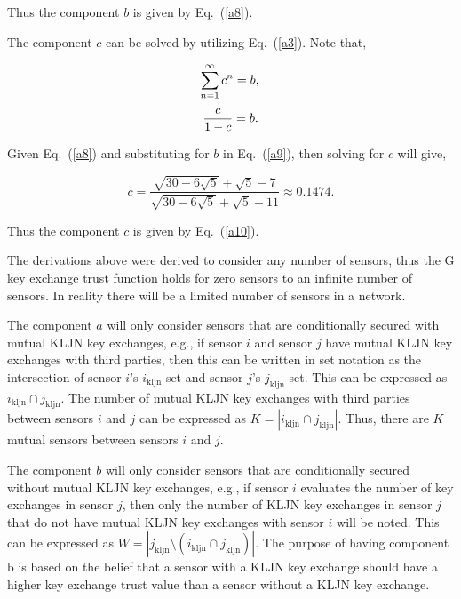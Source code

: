 \documentclass{ws-fnl2}
\begin{document}
\noindent
Thus the component $b$ is given by Eq.~(\ref{a8}).


The component $c$ can be solved by utilizing Eq.~(\ref{a3}). Note that,

\begin{equation*}
\sum^\infty_{n=1}c^n = b,\\ 
\end{equation*}
\begin{equation}
 \frac{c}{1-c}=b. \\
 \label{a9}
\end{equation}


\noindent
Given Eq.~(\ref{a8}) and substituting for $b$ in Eq.~(\ref{a9}), then solving for $c$ will give,

\begin{equation}
 c=\frac{\sqrt{30-6\sqrt{5}}+\sqrt{5}-7}{\sqrt{30-6\sqrt{5}}+\sqrt{5}-11} \approx 0.1474.
 \label{a10}
\end{equation}

\noindent
Thus the component $c$ is given by Eq.~(\ref{a10}).

The derivations above were derived to consider any number of sensors, thus the G key exchange trust function holds for zero sensors to an infinite number of sensors. In reality there will be a limited number of sensors in a network. 

The component $a$ will only consider sensors that are conditionally secured with mutual KLJN key exchanges, e.g., if sensor $i$ and sensor $j$ have mutual KLJN key exchanges with third parties, then this can be written in set notation as the intersection of sensor $i$'s $i_{\mathrm{kljn}}$ set and sensor $j$'s $j_{\mathrm{kljn}}$ set. This can be expressed as $i_{\mathrm{kljn}} \cap j_{\mathrm{kljn}}$. The number of mutual KLJN key exchanges with third parties between sensors $i$ and $j$ can be expressed as $K=|i_{\mathrm{kljn}} \cap j_{\mathrm{kljn}}|$. Thus, there are $K$ mutual sensors between sensors $i$ and $j$. 

The component $b$ will only consider sensors that are conditionally secured without mutual KLJN key exchanges, e.g., if sensor $i$ evaluates the number of key exchanges in sensor $j$, then only the number of KLJN key exchanges in sensor $j$ that do not have mutual KLJN key exchanges with sensor $i$ will be noted. This can be expressed as $W=|j_{\mathrm{kljn}} \setminus (i_{\mathrm{kljn}} \cap j_{\mathrm{kljn}})|$. The purpose of having component b is based on the belief that a sensor with a KLJN key exchange should have a higher key exchange trust value than a sensor without a KLJN key exchange.
\end{document}
